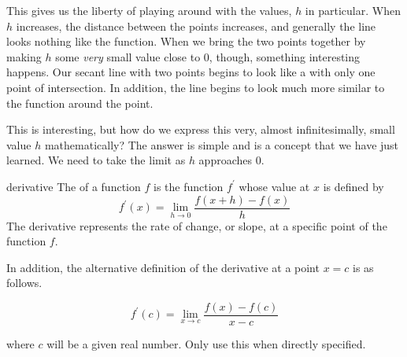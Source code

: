 This gives us the liberty of playing around with the values, \( h \) in particular. When \( h \) increases, the distance between the points increases, and generally the line looks nothing like the function. When we bring the two points together by making \( h \) some \textit{very} small value close to \( 0 \), though, something interesting happens. Our secant line with two points begins to look like a  with only one point of intersection. In addition, the line begins to look much more similar to the function around the point.

\begin{center}
\end{center}

This is interesting, but how do we express this very, almost infinitesimally, small value \( h \) mathematically? The answer is simple and is a concept that we have just learned. We need to take the limit as \( h \) approaches \( 0 \).

\begin{definition}{derivative}
    The  of a function \( f \) is the function \( f^\prime \) whose value at \( x \) is defined by
    \[ f^\prime \left( x \right) = \lim_{h \to 0} \dfrac{f \left( x + h \right) - f \left( x \right)}{h} \]
    The derivative represents the rate of change, or slope, at a specific point of the function \( f \).
\end{definition}

In addition, the alternative definition of the derivative at a point \( x = c \) is as follows.

\[ f^\prime \left( c \right) = \lim_{x \to c} \dfrac{f \left( x \right) - f \left( c \right)}{x - c} \]

where \( c \) will be a given real number. Only use this when directly specified.

